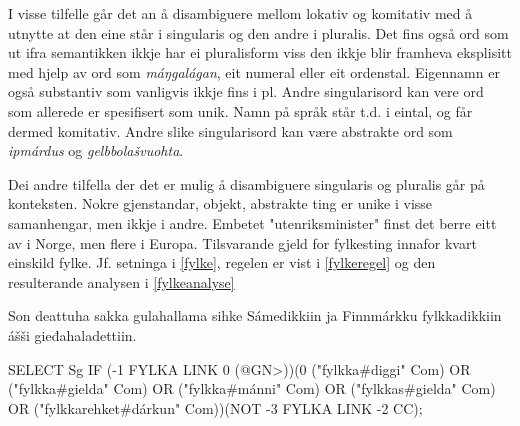 \documentclass[a4paper,nynorsk]{article}
\begin{document}
I visse tilfelle  går det an å disambiguere mellom lokativ og komitativ med å utnytte at den eine står i singularis og den andre i pluralis. %
Det fins også ord som ut ifra semantikken ikkje har ei pluralisform viss den ikkje blir framheva eksplisitt med hjelp av ord som \textit{máŋgalágan}, eit numeral eller eit ordenstal. Eigennamn er også substantiv som vanligvis ikkje fins i pl. Andre singularisord kan vere ord som allerede er spesifisert som unik. Namn på språk står t.d. i eintal, og får dermed komitativ. Andre slike singularisord kan være abstrakte ord som \emph{ipmárdus} og \emph{gelbbolašvuohta}. %

Dei andre tilfella der det er mulig å disambiguere singularis og pluralis går på konteksten. Nokre gjenstandar, objekt, abstrakte ting er unike i visse samanhengar, men ikkje i andre. Embetet "utenriksminister" finst det berre eitt av i Norge, men flere i Europa. Tilsvarande gjeld for fylkesting innafor kvart einskild fylke. Jf. setninga i \ref{fylke}, regelen er vist i \ref{fylkeregel} og den resulterande analysen i \ref{fylkeanalyse} %

\begin{example}\label{fylke}
Son deattuha sakka gulahallama sihke Sámedikkiin ja Finnmárkku fylkkadikkiin ášši gieđahaladettiin.
\end{example}

\begin{example}\label{fylkeregel}
SELECT Sg IF (-1 FYLKA LINK 0 (@GN>))(0 ("fylkka\#diggi" Com) OR ("fylkka\#gielda" Com) OR ("fylkka\#mánni" Com) OR ("fylkkas\#gielda" Com) OR ("fylkkarehket\#dárkun" Com))(NOT -3 FYLKA LINK -2 CC);
\end{example}
\end{document}
